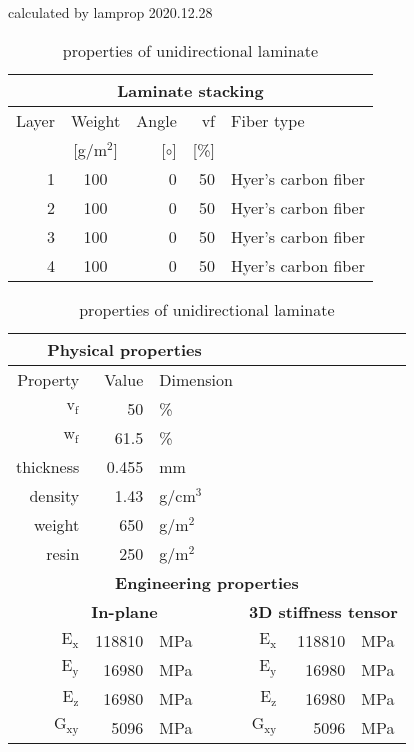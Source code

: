 \begin{table}[!htbp]
  \renewcommand{\arraystretch}{1.2}
  \caption{\label{tab:unidirectional laminate}properties of unidirectional laminate}
  \centering\footnotesize{\rule{0pt}{10pt}
  \tiny calculated by lamprop 2020.12.28\\[3pt]}
    \begin{tabular}[t]{rcrrl}
      \multicolumn{5}{c}{\small\textbf{Laminate stacking}}\\[0.1em]
      \toprule %
      Layer & Weight & Angle & vf & Fiber type\\
            & [g/m$^2$] & [$\circ$] & [\%]\\
      \midrule
      1 &  100 &     0 & 50 & Hyer's carbon fiber\\
      2 &  100 &     0 & 50 & Hyer's carbon fiber\\
      3 &  100 &     0 & 50 & Hyer's carbon fiber\\
      4 &  100 &     0 & 50 & Hyer's carbon fiber\\
      \bottomrule
    \end{tabular}\hspace{0.02\textwidth}
    \begin{tabular}[t]{rrlrrl}
      \multicolumn{3}{c}{\small\textbf{Physical properties}}\\[0.1em]
      \toprule
      Property & Value & Dimension\\
      \midrule
      $\mathrm{v_f}$ & 50 &\%\\
      $\mathrm{w_f}$ & 61.5 &\%\\
      thickness & 0.455 & mm\\
      density & 1.43 & g/cm$^3$\\
      weight & 650 & g/m$^2$\\
      resin & 250 & g/m$^2$\\
      \midrule
      \multicolumn{6}{c}{\small\textbf{Engineering properties}}\\[0.1em]
      \multicolumn{3}{c}{\small\textbf{In-plane}} & 
\multicolumn{3}{c}{\small\textbf{3D stiffness tensor}}\\[0.1em]
      $\mathrm{E_x}$ &   118810 & MPa & $\mathrm{E_x}$ &   118810 & MPa\\
      $\mathrm{E_y}$ &    16980 & MPa & $\mathrm{E_y}$ &    16980 & MPa\\
      $\mathrm{E_z}$ &    16980 & MPa & $\mathrm{E_z}$ &    16980 & MPa\\
      $\mathrm{G_{xy}}$ &     5096 & MPa & $\mathrm{G_{xy}}$ &     5096 & MPa\\

\end{tabular}
\end{table}
